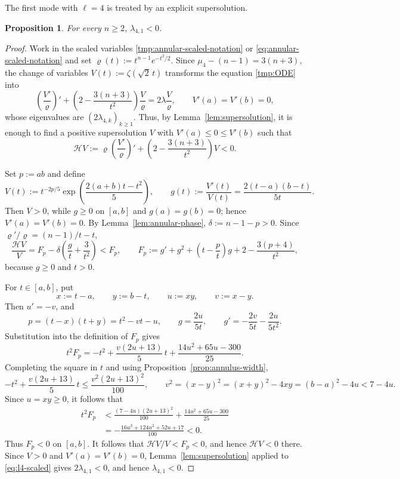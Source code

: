 \documentclass[11pt]{article}
\numberwithin{equation}{section}
\newtheorem{proposition}[theorem]{Proposition}
\theoremstyle{definition}
\begin{document}
The first mode with $\ell=4$ is treated by an explicit supersolution.


\begin{proposition}\label{prop:lambda41}
For every $n\geq2$, $\lambda_{4,1}<0$.
\end{proposition}

\begin{proof}
Work in the scaled variables \eqref{tmp:annular-scaled-notation} or \eqref{eq:annular-scaled-notation} and set
$\varrho(t):=t^{n-1}e^{-t^2/2}$. Since
$\mu_4-(n-1)=3(n+3)$, the change of variables
$V(t):=\zeta(\sqrt2\,t)$ transforms the equation \eqref{tmp:ODE} into
\begin{equation}\label{eq:l4-scaled}
    \left(\frac{V'}{\varrho}\right)'
    +\left(2-\frac{3(n+3)}{t^2}\right)\frac{V}{\varrho}
    =2\lambda\frac{V}{\varrho},
    \qquad V'(a)=V'(b)=0,
\end{equation}
whose eigenvalues are $(2\lambda_{4,k})_{k\geq1}$. Thus, by
Lemma~\ref{lem:supersolution}, it is enough to find a positive supersolution $V$ with
$V'(a)\leq0\leq V'(b)$ such that
\[
    \mathcal HV:=\varrho\left(\frac{V'}{\varrho}\right)'
    +\left(2-\frac{3(n+3)}{t^2}\right)V<0.
\]

Set $p:=ab$ and define
\[
    V(t):=t^{-2p/5}
    \exp\left(\frac{2(a+b)t-t^2}{5}\right),
    \qquad
    g(t):=\frac{V'(t)}{V(t)}
    =\frac{2(t-a)(b-t)}{5t}.
\]
Then $V>0$, while $g\geq0$ on $[a,b]$ and $g(a)=g(b)=0$; hence
$V'(a)=V'(b)=0$. By Lemma~\ref{lem:annular-phase},
$\delta:=n-1-p>0$. Since $\varrho'/\varrho=(n-1)/t-t$,
\[
    \frac{\mathcal HV}{V}
    =F_p-\delta\left(\frac gt+\frac3{t^2}\right)<F_p,
    \qquad
    F_p:=g'+g^2+\left(t-\frac pt\right)g
      +2-\frac{3(p+4)}{t^2},
\]
because $g\geq0$ and $t>0$.

For $t\in[a,b]$, put
\[
    x:=t-a,\qquad y:=b-t,\qquad u:=xy,\qquad v:=x-y.
\]
Then $u'=-v$, and
\[
    p=(t-x)(t+y)=t^2-vt-u,
    \qquad
    g=\frac{2u}{5t},
    \qquad
    g'=-\frac{2v}{5t}-\frac{2u}{5t^2}.
\]
Substitution into the definition of $F_p$ gives
\[
    t^2F_p
    =-t^2+\frac{v(2u+13)}5\,t
      +\frac{14u^2+65u-300}{25}.
\]
Completing the square in $t$ and using Proposition~\ref{prop:annulus-width},
\[
    -t^2+\frac{v(2u+13)}5\,t
    \leq \frac{v^2(2u+13)^2}{100},
    \qquad
    v^2=(x-y)^2=(x+y)^2-4xy
    =(b-a)^2-4u<7-4u.
\]
Since $u=xy\geq0$, it follows that
\[
\begin{split}
    t^2F_p
    &<\frac{(7-4u)(2u+13)^2}{100}
      +\frac{14u^2+65u-300}{25}\\
    &=-\frac{16u^3+124u^2+52u+17}{100}<0.
\end{split}
\]
Thus $F_p<0$ on $[a,b]$. It follows that
$\mathcal HV/V<F_p<0$, and hence $\mathcal HV<0$ there. Since
$V>0$ and $V'(a)=V'(b)=0$, Lemma~\ref{lem:supersolution} applied
to \eqref{eq:l4-scaled} gives $2\lambda_{4,1}<0$, and hence
$\lambda_{4,1}<0$.
\end{proof}
\end{document}
